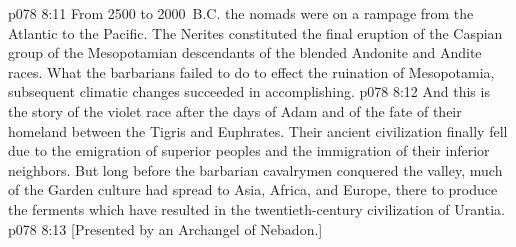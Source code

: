 \vs p078 8:11 From 2500 to 2000~B.C. the nomads were on a rampage from the Atlantic to the Pacific. The Nerites constituted the final eruption of the Caspian group of the Mesopotamian descendants of the blended Andonite and Andite races. What the barbarians failed to do to effect the ruination of Mesopotamia, subsequent climatic changes succeeded in accomplishing.
\pc \vs p078 8:12 And this is the story of the violet race after the days of Adam and of the fate of their homeland between the Tigris and Euphrates. Their ancient civilization finally fell due to the emigration of superior peoples and the immigration of their inferior neighbors. But long before the barbarian cavalrymen conquered the valley, much of the Garden culture had spread to Asia, Africa, and Europe, there to produce the ferments which have resulted in the twentieth\hyp{}century civilization of Urantia.
\vsetoff
\vs p078 8:13 [Presented by an Archangel of Nebadon.]
